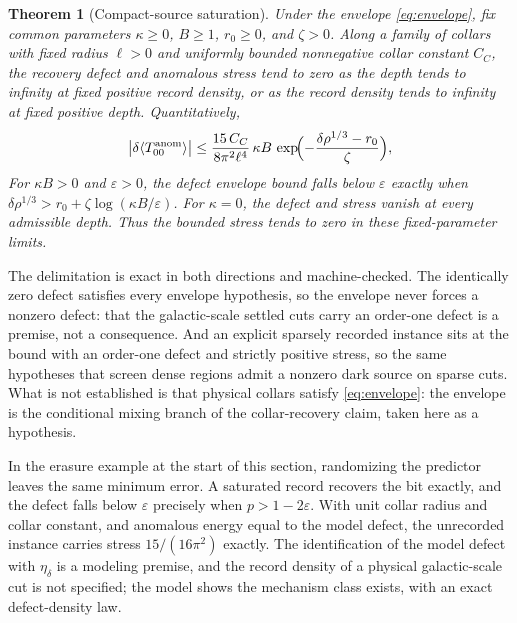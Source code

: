 \documentclass[11pt]{article}
\newtheorem{theorem}{Theorem}[section]
\begin{document}
\begin{theorem}[Compact-source saturation]
\label{thm:saturation}
Under the envelope \eqref{eq:envelope}, fix common parameters
\(\kappa\geq0\), \(B\geq1\), \(r_0\geq0\), and \(\zeta>0\).
Along a family of collars with fixed radius \(\ell>0\) and uniformly bounded
nonnegative collar constant \(C_C\), the recovery defect and anomalous stress
tend to zero as the depth tends to infinity at fixed positive record density,
or as the record density tends to infinity at fixed positive depth.
Quantitatively,
\begin{equation}
\bigl|\delta\langle T_{00}^{\rm anom}\rangle\bigr|
\le\frac{15\,C_C}{8\pi^2\ell^4}\,\kappa B\,
\exp\!\Bigl(-\frac{\delta\rho^{1/3}-r_0}{\zeta}\Bigr),
\label{eq:rate}
\end{equation}
For \(\kappa B>0\) and \(\varepsilon>0\), the defect envelope bound falls
below \(\varepsilon\) exactly when
\(\delta\rho^{1/3}>r_0+\zeta\log(\kappa B/\varepsilon)\).
For \(\kappa=0\), the defect and stress vanish at every admissible depth.
Thus the bounded stress tends to zero in these fixed-parameter limits.
\end{theorem}

The delimitation is exact in both directions and machine-checked. The
identically zero defect satisfies every envelope hypothesis, so the envelope
never forces a nonzero defect: that the galactic-scale settled cuts carry an
order-one defect is a premise, not a consequence. And an explicit sparsely
recorded instance sits at the bound with an order-one defect and strictly
positive stress, so the same hypotheses that screen dense regions admit a
nonzero dark source on sparse cuts. What is not established is that physical
collars satisfy \eqref{eq:envelope}: the envelope is the conditional mixing
branch of the collar-recovery claim, taken here as a hypothesis.

In the erasure example at the start of this section, randomizing the
predictor leaves the same minimum error. A saturated record recovers
the bit exactly, and the defect falls below \(\varepsilon\) precisely
when \(p>1-2\varepsilon\). With unit collar radius and collar constant, and anomalous energy
equal to the model defect, the unrecorded instance carries stress
\(15/(16\pi^2)\) exactly. The identification of the model
defect with \(\eta_\delta\) is a modeling premise, and the record density
of a physical galactic-scale cut is not specified; the model shows the
mechanism class exists, with an exact defect-density law.
\end{document}
